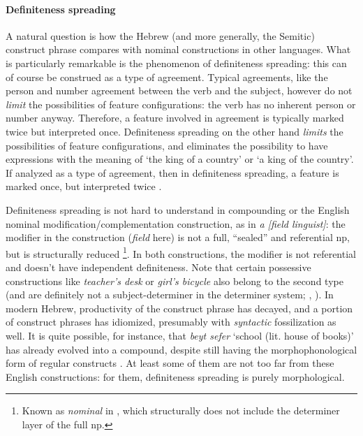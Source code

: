 \documentclass[a4paper, oneside, 12pt]{report}
\newcommand*{\citepage}[1]{p.~{#1}}
\newcommand{\form}[1]{\emph{#1}}
\newcommand{\translate}[1]{`#1'}
\begin{document}
\paragraph*{Definiteness spreading}
A natural question is how the Hebrew (and more generally, the Semitic) construct phrase
compares with nominal constructions in other languages.
What is particularly remarkable is the phenomenon of definiteness spreading:
this can of course be construed as a type of agreement.
Typical agreements, like the person and number agreement between the verb and the subject,
however do not \emph{limit} the possibilities of feature configurations:
the verb has no inherent person or number anyway.
Therefore, a feature involved in agreement is typically marked twice but interpreted once.
Definiteness spreading on the other hand \emph{limits} the possibilities of feature configurations,
and eliminates the possibility to have expressions with the meaning of 
\translate{the king of a country} or \translate{a king of the country}.
If analyzed as a type of agreement,
then in definiteness spreading, a feature is marked once,
but interpreted twice \citep{dobrovie2000definiteness}.

Definiteness spreading is not hard to understand in compounding
or the English nominal modification/complementation construction, as in \form{a [field linguist]}:
the modifier in the construction (\form{field} here) is not a full, ``sealed'' and referential \ac{np},
but is structurally reduced%
\footnote{
    Known as \form{nominal} in \citet{cgel},
    which structurally does not include the determiner layer of the full \ac{np}.
}.
In both constructions, the modifier is not referential
and doesn't have independent definiteness.
Note that certain possessive constructions like \form{teacher's desk} or \form{girl's bicycle} also belong to the second type
(and are definitely not a subject-determiner in the determiner system;
\citealt[\citepage{469}]{cgel}, \citealt{alexiadou2005possessors}).
In modern Hebrew, productivity of the construct phrase has decayed,
and a portion of construct phrases has idiomized,
presumably with \emph{syntactic} fossilization as well.
It is quite possible, for instance, that \form{beyt sefer} \translate{school (lit. house of books)}
has already evolved into a compound,
despite still having the morphophonological form of regular constructs
\citep{siloni2003prosodic}.
At least some of them are not too far from these English constructions:
for them, definiteness spreading is purely morphological.
\end{document}
